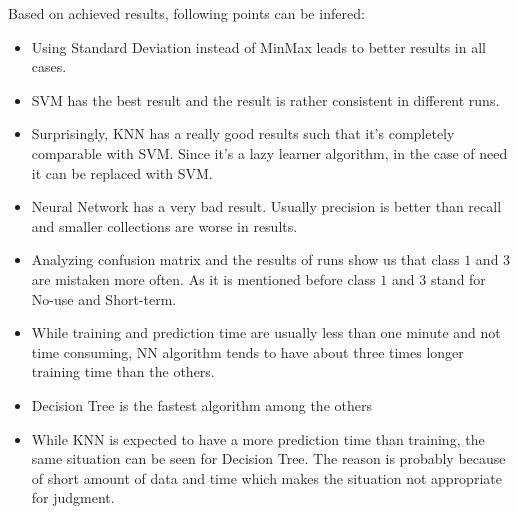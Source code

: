 Based on achieved results, following points can be infered:
\begin{itemize}
\item Using Standard Deviation instead of MinMax leads to better results in all cases.
\item SVM has the best result and the result is rather consistent in different runs.
\item Surprisingly, KNN has a really good results such that it's completely comparable with SVM. Since it's a lazy learner algorithm, in the case of need it can be replaced with SVM.
\item Neural Network has a very bad result. Usually precision is better than recall and smaller collections are worse in results.
\item Analyzing confusion matrix and the results of runs show us that class $1$ and $3$ are mistaken more often. As it is mentioned before class $1$ and $3$ stand for No-use and Short-term.
\item While training and prediction time are usually less than one minute and not time consuming, NN algorithm tends to have about three times longer training time than the others.
\item Decision Tree is the fastest algorithm among the others
\item While KNN is expected to have a more prediction time than training, the same situation can be seen for Decision Tree. The reason is probably because of short amount of data and time which makes the situation not appropriate for judgment.
\end{itemize}
